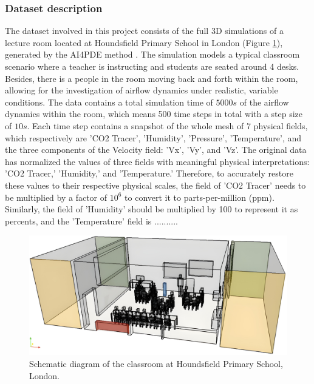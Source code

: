 \documentclass[final-report]{article-template}
\begin{document}
\subsubsection{Dataset description}
The dataset involved in this project consists of the full 3D simulations of a lecture room located at Houndsfield Primary School in London (Figure \ref{fig:classroom_schema}), generated by the AI4PDE method \cite{chen2024using}. The simulation models a typical classroom scenario where a teacher is instructing and students are seated around 4 desks. Besides, there is a people in the room moving back and forth within the room, allowing for the investigation of airflow dynamics under realistic, variable conditions. The data contains a total simulation time of $5000s$ of the airflow dynamics within the room, which means 500 time steps in total with a step size of $10s$. Each time step contains a snapshot of the whole mesh of 7 physical fields, which respectively are 'CO2 Tracer', 'Humidity', 'Pressure', 'Temperature', and the three components of the Velocity field: 'Vx', 'Vy', and 'Vz'. The original data has normalized the values of three fields with meaningful physical interpretations: 'CO2 Tracer,' 'Humidity,' and 'Temperature.' Therefore, to accurately restore these values to their respective physical scales, the field of 'CO2 Tracer' needs to be multiplied by a factor of $10^6$ to convert it to parts-per-million (ppm). Similarly, the field of 'Humidity' should be multiplied by 100 to represent it as percents, and the 'Temperature' field is .......... \\

\begin{figure}[htbp]
    \centering
    \includegraphics[width=13cm, trim=0cm 0cm 0cm 0cm, clip]{figures/classroom_schema.jpg}
    \caption{Schematic diagram of the classroom at Houndsfield Primary School, London.}
    \label{fig:classroom_schema}
\end{figure}
\end{document}
